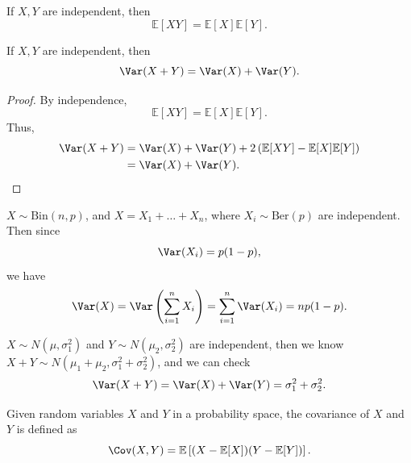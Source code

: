 \begin{corollary}
    If \(X, Y\) are independent, then 
    \[
        \mathbb{E} [XY] = \mathbb{E} [X] \mathbb{E} [Y].
    \] 
\end{corollary}

\begin{corollary}
    If \(X, Y\) are independent, then 
    \[
        \Var(X + Y) = \Var(X) + \Var(Y).
    \] 
\end{corollary}

\begin{proof}
    By independence, 
    \[
        \mathbb{E} [X Y] = \mathbb{E} [X] \mathbb{E} [Y].
    \]
    Thus,
    \begin{align*}
        \Var(X + Y) &= \Var(X) + \Var(Y) + 2 \left( \mathbb{E} [X Y] - \mathbb{E} [X] \mathbb{E} [Y] \right) \\
        &= \Var(X) + \Var(Y). 
    \end{align*}
\end{proof}

\begin{eg}
    \(X \sim \mathrm{Bin}(n, p)\), and \(X = X_1 + \dots + X_n\), where \(X_i \sim \mathrm{Ber}(p) \) are independent. Then since
    \[
        \Var(X_i) = p(1 - p),
    \]   
    we have 
    \[
        \Var(X) = \Var\left( \sum_{i=1}^n X_i  \right) = \sum_{i=1}^n \Var(X_i) = n p (1 - p). 
    \]
\end{eg}

\begin{eg}
    \(X \sim N(\mu , \sigma _1^2)\) and \(Y \sim N(\mu _2, \sigma _2^2)\) are independent, then we know \(X + Y \sim N(\mu _1 + \mu _2, \sigma _1^2 + \sigma _2^2)\), and we can check 
    \[
        \Var(X + Y) = \Var(X) + \Var(Y) = \sigma _1^2 + \sigma _2^2.
    \]   
\end{eg}

\begin{definition}
    Given random variables \(X\) and \(Y\) in a probability space, the covariance of \(X\) and \(Y\) is defined as 
    \[
        \Cov(X, Y) = \mathbb{E} \left[ (X - \mathbb{E} [X])(Y - \mathbb{E} [Y]) \right]. 
    \]    
\end{definition}

